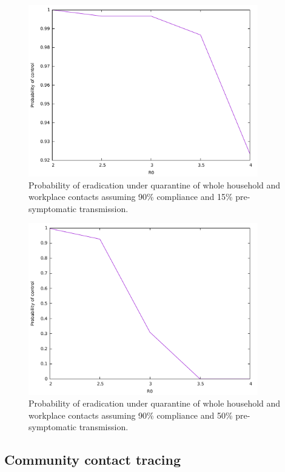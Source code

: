 \documentclass{article}
\begin{document}
\begin{figure}
\begin{center}
\includegraphics[width = 10cm]{householdAndWorkplace15pre.pdf}
\end{center}
\caption{Probability of eradication under quarantine of whole household and workplace contacts assuming 90\% compliance and 15\% pre-symptomatic transmission.}
\label{householdWorkplace15}
\end{figure}

\begin{figure}
\begin{center}
\includegraphics[width = 10cm]{householdAndWorkplace50pre.pdf}
\end{center}
\caption{Probability of eradication under quarantine of whole household and workplace contacts assuming 90\% compliance and 50\% pre-symptomatic transmission.}
\label{householdWorkplace50}
\end{figure}

\subsection{Community contact tracing}
\end{document}
